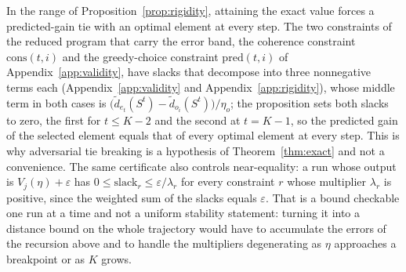 \begin{remark}\label{rem:rigidity-ties}
In the range of Proposition~\ref{prop:rigidity}, attaining the exact value
forces a predicted-gain tie with an optimal element at every step.  The two
constraints of the reduced program that carry the error band, the coherence
constraint $\mathrm{cons}(t,i)$ and the greedy-choice constraint
$\mathrm{pred}(t,i)$ of Appendix~\ref{app:validity}, have slacks that
decompose into three nonnegative terms each (Appendix~\ref{app:validity} and
Appendix~\ref{app:rigidity}), whose middle term in both cases is
$\bigl(\tilde d_{e_t}(S^{t})-\tilde d_{o_i}(S^{t})\bigr)/\eta_o$; the
proposition sets both slacks to zero, the first for $t\le K-2$ and the second
at $t=K-1$, so the predicted gain of the selected element equals that of every
optimal element at every step.  This is why adversarial tie breaking is a
hypothesis of Theorem~\ref{thm:exact} and not a convenience.  The same
certificate also controls near-equality: a run whose output is
$V_j(\eta)+\varepsilon$ has $0\le\mathrm{slack}_r\le\varepsilon/\lambda_r$ for
every constraint $r$ whose multiplier $\lambda_r$ is positive, since the
weighted sum of the slacks equals $\varepsilon$.  That is a bound checkable
one run at a time and not a uniform stability statement: turning it into a
distance bound on the whole trajectory would have to accumulate the errors of
the recursion above and to handle the multipliers degenerating as $\eta$
approaches a breakpoint or as $K$ grows.
\end{remark}

